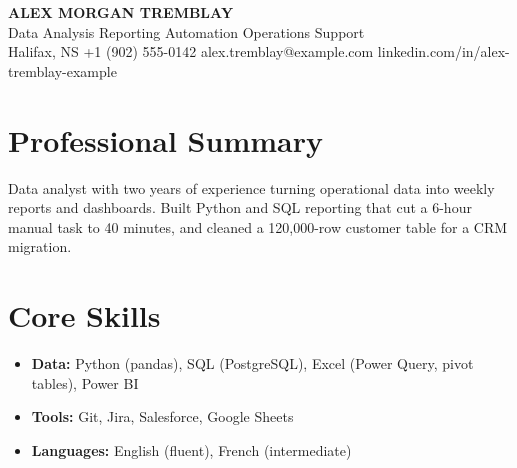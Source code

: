 \documentclass[11pt,letterpaper]{article}
\begin{document}
\begin{center}
  {\LARGE\bfseries ALEX MORGAN TREMBLAY}\\[2pt]
  Data Analysis \textbar{} Reporting Automation \textbar{} Operations Support\\[2pt]
  Halifax, NS \textbar{} +1 (902) 555-0142 \textbar{} alex.tremblay@example.com \textbar{} linkedin.com/in/alex-tremblay-example
\end{center}

\section{Professional Summary}
Data analyst with two years of experience turning operational data into weekly reports and dashboards. Built Python
and SQL reporting that cut a 6-hour manual task to 40 minutes, and cleaned a 120,000-row customer table for a
CRM migration.

\section{Core Skills}
\begin{itemize}
  \item \textbf{Data:} Python (pandas), SQL (PostgreSQL), Excel (Power Query, pivot tables), Power BI
  \item \textbf{Tools:} Git, Jira, Salesforce, Google Sheets
  \item \textbf{Languages:} English (fluent), French (intermediate)
\end{itemize}
\end{document}
